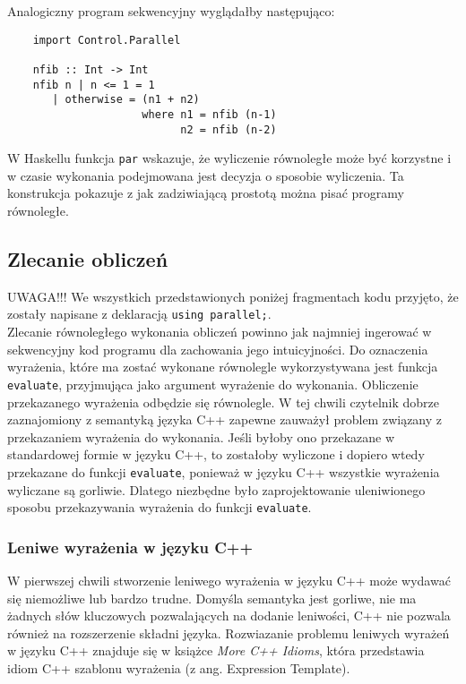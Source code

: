   Analogiczny program sekwencyjny wyglądałby następująco:
  \begin{verbatim}
    import Control.Parallel

    nfib :: Int -> Int
    nfib n | n <= 1 = 1
       | otherwise = (n1 + n2)
                     where n1 = nfib (n-1)
                           n2 = nfib (n-2)
  \end{verbatim}
  
  W Haskellu funkcja \verb|par| wskazuje, że wyliczenie równoległe może być korzystne i w czasie wykonania podejmowana jest decyzja o sposobie wyliczenia.
  Ta konstrukcja pokazuje z jak zadziwiającą prostotą można pisać programy równoległe.
  
\subsection{Zlecanie obliczeń}

  UWAGA!!! We wszystkich przedstawionych poniżej fragmentach kodu przyjęto, że zostały napisane z deklaracją \verb|using parallel;|.\\

  Zlecanie równoległego wykonania obliczeń powinno jak najmniej ingerować w sekwencyjny kod programu dla zachowania jego intuicyjności.
  Do oznaczenia wyrażenia, które ma zostać wykonane równolegle wykorzystywana jest funkcja \verb|evaluate|, przyjmująca jako argument wyrażenie do wykonania.
  Obliczenie przekazanego wyrażenia odbędzie się równolegle.
  W tej chwili czytelnik dobrze zaznajomiony z semantyką języka C++ zapewne zauważył problem związany z przekazaniem wyrażenia do wykonania.
  Jeśli byłoby ono przekazane w standardowej formie w języku C++, to zostałoby wyliczone i dopiero wtedy przekazane do funkcji \verb|evaluate|, ponieważ w języku C++ wszystkie wyrażenia wyliczane są gorliwie.
  Dlatego niezbędne było zaprojektowanie uleniwionego sposobu przekazywania wyrażenia do funkcji \verb|evaluate|.
  
\subsubsection{Leniwe wyrażenia w języku C++}

  W pierwszej chwili stworzenie leniwego wyrażenia w języku C++ może wydawać się niemożliwe lub bardzo trudne. 
  Domyśla semantyka jest gorliwe, nie ma żadnych słów kluczowych pozwalających na dodanie leniwości, C++ nie pozwala również na rozszerzenie składni języka.
  Rozwiazanie problemu leniwych wyrażeń w języku C++ znajduje się w książce \textit{More C++ Idioms}\cite{idioms}, która przedstawia idiom C++ szablonu wyrażenia (z ang. Expression Template).
  
